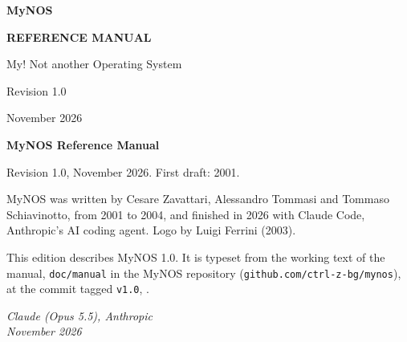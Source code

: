 \documentclass[paper=a5,fontsize=10pt,twoside,openany,parskip=half-,
  headings=small,toc=indentunnumbered]{scrbook}
\newcommand\mynostitle{MyNOS Reference Manual}
\newcommand\mynosrevision{Revision 1.0}
\newcommand\mynosdate{November 2026}
\begin{document}
\mynosalign
\frontmatter
\pagestyle{empty}

\begin{titlepage}
\centering
\vspace*{35mm}
{\fontsize{22}{26}\selectfont\bfseries MyNOS\par}
\vspace{4mm}
{\fontsize{12}{15}\selectfont\bfseries REFERENCE MANUAL\par}
\vspace{2mm}
{\small My! Not another Operating System\par}
\vfill
\mynosrevision\par
\mynosdate\par
\end{titlepage}

\null\vfill
{\small\RaggedRight
\textbf{\mynostitle}\par
\mynosrevision, \mynosdate. First draft: 2001.\par
\medskip
MyNOS was written by Cesare Zavattari, Alessandro Tommasi and Tommaso
Schiavinotto, from 2001 to 2004, and finished in 2026 with Claude Code,
Anthropic's AI coding agent. Logo by Luigi Ferrini (2003).\par
\medskip
This edition describes MyNOS 1.0. It is typeset from the working text
of the manual, \texttt{doc/manual} in the MyNOS repository
(\texttt{github.com/ctrl-z-bg/mynos}), at the commit tagged
\texttt{v1.0}, \texttt{\unskip}.\par
\medskip
\mynosfontsline\par\par}
\clearpage

\pagestyle{plain}

\begin{flushright}\itshape Claude (Opus 5.5), Anthropic\\ November 2026\end{flushright}



\pagestyle{fancy}
\tableofcontents

\mainmatter
\pagestyle{fancy}


\backmatter
\printindex
\end{document}
